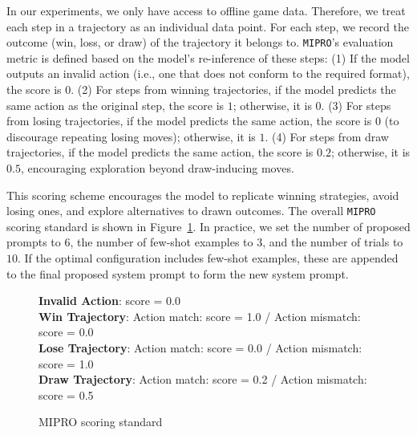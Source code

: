 In our experiments, we only have access to offline game data. Therefore, we treat each step in a trajectory as an individual data point. For each step, we record the outcome (win, loss, or draw) of the trajectory it belongs to. \texttt{MIPRO}’s evaluation metric is defined based on the model’s re-inference of these steps: (1) If the model outputs an invalid action (i.e., one that does not conform to the required format), the score is $0$. (2) For steps from winning trajectories, if the model predicts the same action as the original step, the score is $1$; otherwise, it is $0$. (3) For steps from losing trajectories, if the model predicts the same action, the score is $0$ (to discourage repeating losing moves); otherwise, it is $1$. (4) For steps from draw trajectories, if the model predicts the same action, the score is $0.2$; otherwise, it is $0.5$, encouraging exploration beyond draw-inducing moves.

This scoring scheme encourages the model to replicate winning strategies, avoid losing ones, and explore alternatives to drawn outcomes. The overall \texttt{MIPRO} scoring standard is shown in Figure~\ref{fig:mipro_scoring_standard}. In practice, we set the number of proposed prompts to $6$, the number of few-shot examples to $3$, and the number of trials to $10$. If the optimal configuration includes few-shot examples, these are appended to the final proposed system prompt to form the new system prompt.

\begin{figure}[ht]
\centering

\begin{tcolorbox}[
    colback=blue!5!white,
    colframe=blue!40!white,
    left=1mm, right=1mm, top=1mm, bottom=1mm,
    width=\textwidth,
    enhanced,
    attach boxed title to top center={yshift=-2mm},
    boxed title style={colback=blue!40!white},
    title={MIPRO scoring standard},
    label=box:mipro_scoring
]

\textbf{Invalid Action}:
score = 0.0 \\

\textbf{Win Trajectory}:
Action match: score = 1.0 / 
Action mismatch: score = 0.0 \\

\textbf{Lose Trajectory}: 
Action match: score = 0.0 /
Action mismatch: score = 1.0 \\

\textbf{Draw Trajectory}: 
Action match: score = 0.2 /
Action mismatch: score = 0.5

\end{tcolorbox}

\caption{MIPRO scoring standard} \label{fig:mipro_scoring_standard}
\end{figure}

